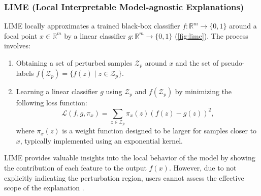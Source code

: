 \documentclass[11pt]{article}
\begin{document}
\subsubsection[LIME]{%
  LIME (Local Interpretable Model-agnostic Explanations)
  \cite{ribeiro2016why}
}
LIME locally
approximates a trained black-box classifier $f: \mathbb{R}^m \to \{0,1\}$
around a focal point $x \in \mathbb{R}^m$
by a linear classifier $g: \mathbb{R}^m \to \{0,1\}$
(\cref{fig:lime}).
The process involves:
\begin{enumerate}
  \item Obtaining a set of perturbed samples $\mathcal{Z}_p$ around $x$
        and the set of pseudo-labels $f(\mathcal{Z}_p) = \{f(z) \mid z \in \mathcal{Z}_p\}$.
  \item Learning a linear classifier $g$
        using $\mathcal{Z}_p$ and $f(\mathcal{Z}_p)$
        by minimizing the following loss function:
        \begin{equation}
          \label{eq:lime_loss}
          \mathcal{L}(f,g,\pi_x)=\sum_{z\in\mathcal{Z}_p}
          \pi_x(z){\left(f(z)-g(z)\right)}^2,
        \end{equation}
        where $\pi_x(z)$ is a weight function designed to be larger for samples
        closer to $x$, typically implemented using an exponential kernel.
\end{enumerate}
LIME provides valuable insights into the local behavior of the model
by showing the contribution of each feature to the output $f(x)$.
However, due to not explicitly indicating the perturbation region,
users cannot assess the effective scope of the explanation
\cite{ribeiro2018anchors}.
\end{document}
